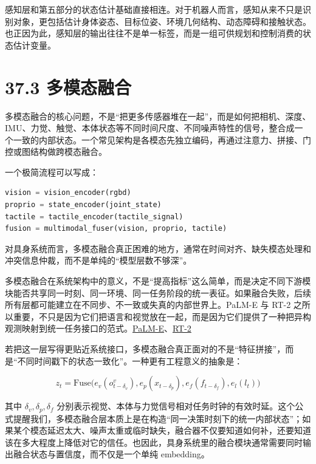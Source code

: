 感知层和第五部分的状态估计基础直接相连。对于机器人而言，感知从来不只是识别对象，更包括估计身体姿态、目标位姿、环境几何结构、动态障碍和接触状态。也正因为此，感知层的输出往往不是单一标签，而是一组可供规划和控制消费的状态估计变量。

\section*{37.3 多模态融合}


多模态融合的核心问题，不是“把更多传感器堆在一起”，而是如何把相机、深度、IMU、力觉、触觉、本体状态等不同时间尺度、不同噪声特性的信号，整合成一个一致的内部状态。一个常见架构是各模态先独立编码，再通过注意力、拼接、门控或图结构做跨模态融合。

一个极简流程可以写成：

\begin{lstlisting}[language=python]
vision = vision_encoder(rgbd)
proprio = state_encoder(joint_state)
tactile = tactile_encoder(tactile_signal)
fusion = multimodal_fuser(vision, proprio, tactile)
\end{lstlisting}

对具身系统而言，多模态融合真正困难的地方，通常在时间对齐、缺失模态处理和冲突信息仲裁，而不是单纯的“模型层数不够深”。

多模态融合在系统架构中的意义，不是“提高指标”这么简单，而是决定不同下游模块能否共享同一时刻、同一环境、同一任务阶段的统一表征。如果融合失败，后续所有层都可能建立在不同步、不一致或失真的内部世界上。PaLM-E 与 RT-2 之所以重要，不只是因为它们把语言和视觉放在一起，而是因为它们提供了一种把异构观测映射到统一任务接口的范式。\href{https://arxiv.org/abs/2303.03378}{PaLM-E}、\href{https://arxiv.org/abs/2307.15818}{RT-2}

若把这一层写得更贴近系统接口，多模态融合真正面对的不是“特征拼接”，而是“不同时间戳下的状态一致化”。一种更有工程意义的抽象是：

\begingroup
\scriptsize
\begin{equation*}
z_t = \mathrm{Fuse}\bigl(
e_v(o^v_{t-\delta_v}),
e_p(x_{t-\delta_p}),
e_f(f_{t-\delta_f}),
e_l(l_t)
\bigr)
\end{equation*}
\endgroup

其中 \(\delta_v,\delta_p,\delta_f\) 分别表示视觉、本体与力觉信号相对任务时钟的有效时延。这个公式提醒我们，多模态融合层本质上是在构造“同一决策时刻下的统一内部状态”；如果某个模态延迟太大、噪声太重或临时缺失，融合器不仅要知道如何补，还要知道该在多大程度上降低对它的信任。也因此，具身系统里的融合模块通常需要同时输出融合状态与置信度，而不仅是一个单纯 embedding。


